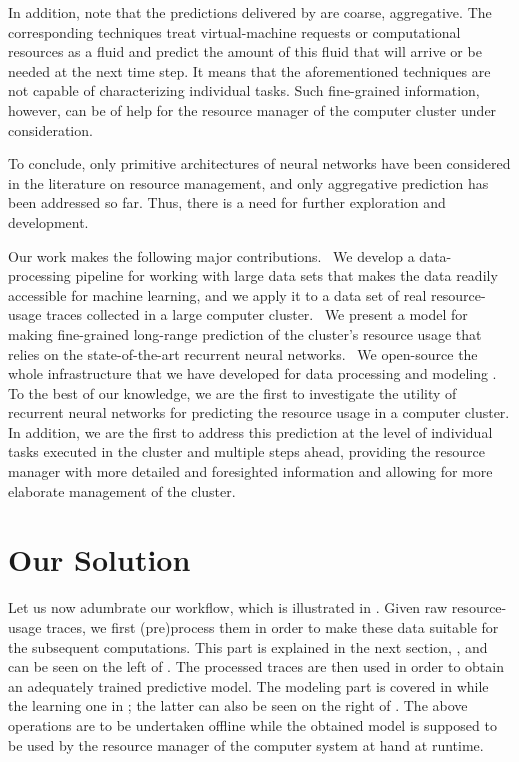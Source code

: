 In addition, note that the predictions delivered by \cite{dabbagh2015,
ismaeel2015, cao2014} are coarse, aggregative. The corresponding techniques
treat virtual-machine requests or computational resources as a fluid and predict
the amount of this fluid that will arrive or be needed at the next time step. It
means that the aforementioned techniques are not capable of characterizing
individual tasks. Such fine-grained information, however, can be of help for the
resource manager of the computer cluster under consideration.

To conclude, only primitive architectures of neural networks have been
considered in the literature on resource management, and only aggregative
prediction has been addressed so far. Thus, there is a need for further
exploration and development.

Our work makes the following major contributions. \one~We develop a
data-processing pipeline for working with large data sets that makes the data
readily accessible for machine learning, and we apply it to a data set of real
resource-usage traces collected in a large computer cluster. \two~We present a
model for making fine-grained long-range prediction of the cluster's resource
usage that relies on the state-of-the-art recurrent neural networks. \three~We
open-source the whole infrastructure that we have developed for data processing
and modeling \cite{sources}. To the best of our knowledge, we are the first to
investigate the utility of recurrent neural networks for predicting the resource
usage in a computer cluster. In addition, we are the first to address this
prediction at the level of individual tasks executed in the cluster and multiple
steps ahead, providing the resource manager with more detailed and foresighted
information and allowing for more elaborate management of the cluster.

\section{Our Solution}

Let us now adumbrate our workflow, which is illustrated in .
Given raw resource-usage traces, we first (pre)process them in order to make
these data suitable for the subsequent computations. This part is explained in
the next section, , and can be seen on the left of .
The processed traces are then used in order to obtain an adequately trained
predictive model. The modeling part is covered in  while the
learning one in ; the latter can also be seen on the right of
. The above operations are to be undertaken offline while the
obtained model is supposed to be used by the resource manager of the computer
system at hand at runtime.

